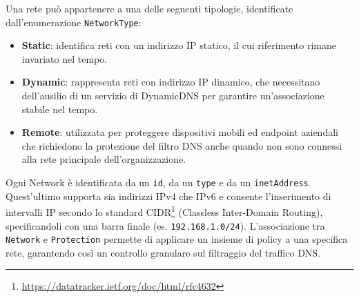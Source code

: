 Una rete può appartenere a una delle seguenti tipologie, identificate dall'enumerazione \texttt{NetworkType}:
\begin{itemize}
  \item \textbf{Static}: identifica reti con un indirizzo IP statico, il cui riferimento rimane invariato nel tempo.
  \item \textbf{Dynamic}: rappresenta reti con indirizzo IP dinamico, che necessitano dell’ausilio di un servizio di DynamicDNS per garantire un'associazione stabile nel tempo.
  \item \textbf{Remote}: utilizzata per proteggere dispositivi mobili ed endpoint aziendali che richiedono la protezione del filtro DNS anche quando non sono connessi alla rete principale dell'organizzazione.
\end{itemize}

Ogni Network è identificata da un \texttt{id}, da un \texttt{type} e da un \texttt{inetAddress}. Quest'ultimo supporta sia indirizzi IPv4 che IPv6 e consente l'inserimento di intervalli IP secondo lo standard CIDR\footnote{\url{https://datatracker.ietf.org/doc/html/rfc4632}} (Classless Inter-Domain Routing), specificandoli con una barra finale (es. \texttt{192.168.1.0/24}). L'associazione tra \texttt{Network} e \texttt{Protection} permette di applicare un insieme di policy a una specifica rete, garantendo così un controllo granulare sul filtraggio del traffico DNS.

